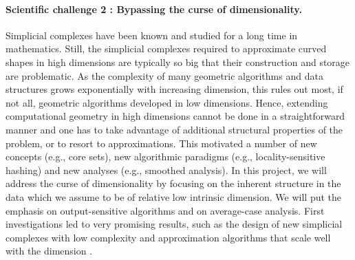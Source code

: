 \paragraph{Scientific challenge 2 :  Bypassing the curse of dimensionality.} 
Simplicial complexes have been known and studied for a long time in mathematics.  Still, the simplicial complexes required to approximate curved shapes in high dimensions are typically so big that their construction and storage are problematic. As the complexity of many geometric algorithms and data structures grows exponentially with increasing dimension, %
this rules out most, if not all, geometric algorithms developed in low dimensions.  Hence, extending computational geometry in high dimensions cannot be done in a straightforward manner and one has to take advantage of additional structural properties of the problem, or to resort to approximations. This motivated a number of new concepts (e.g., core sets), new algorithmic paradigms (e.g., locality-sensitive hashing) and new analyses (e.g., smoothed analysis).  In this project, we will address the curse of dimensionality by focusing on the inherent structure in the data which we assume to be of relative low intrinsic dimension.  We will put the emphasis on output-sensitive algorithms and on average-case analysis.  First investigations led to very promising results, such as the design of new simplicial complexes with low complexity and approximation algorithms that scale well with the dimension \cite{geometrica-7142i}.








